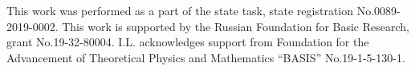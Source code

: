 \documentclass[
    pra,  
    twocolumn, 
    floatfix, 
    amsmath, 
    amssymb, 
    superscriptaddress
]{revtex4-1}
\begin{document}








\begin{acknowledgments}
This work was performed as a part of the state task, state registration No.0089-2019-0002. This work is supported by the Russian Foundation for Basic Research, grant No.19-32-80004. I.L. acknowledges support from Foundation for the Advancement of Theoretical Physics and Mathematics “BASIS” No.19-1-5-130-1.  
\end{acknowledgments}

%


\end{document}
